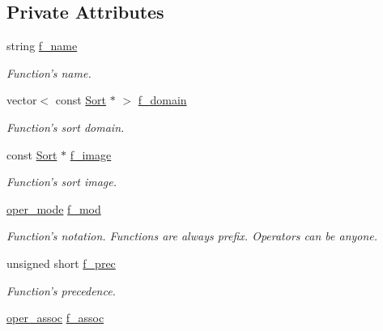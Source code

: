 \subsection*{Private Attributes}
\begin{DoxyCompactItemize}
\item 
string \hyperlink{classgenevalmag_1_1Function_adab115bdcdc014b30b2b9c9e2da07109}{f\_\-name}
\begin{DoxyCompactList}\small\item\em Function's name. \item\end{DoxyCompactList}\item 
vector$<$ const \hyperlink{classgenevalmag_1_1Sort}{Sort} $\ast$ $>$ \hyperlink{classgenevalmag_1_1Function_ae8e057eeebfabdc524e10e42e54da43c}{f\_\-domain}
\begin{DoxyCompactList}\small\item\em Function's sort domain. \item\end{DoxyCompactList}\item 
const \hyperlink{classgenevalmag_1_1Sort}{Sort} $\ast$ \hyperlink{classgenevalmag_1_1Function_a4abfbb9239231cf2a586935546a585f8}{f\_\-image}
\begin{DoxyCompactList}\small\item\em Function's sort image. \item\end{DoxyCompactList}\item 
\hyperlink{namespacegenevalmag_a8e412eca3897f0532c6f1997af777ba4}{oper\_\-mode} \hyperlink{classgenevalmag_1_1Function_a63645db8078f5c96b2c24d4873ee0fcd}{f\_\-mod}
\begin{DoxyCompactList}\small\item\em Function's notation. Functions are always prefix. Operators can be anyone. \item\end{DoxyCompactList}\item 
unsigned short \hyperlink{classgenevalmag_1_1Function_a24cd8c438fe7af6c23d91a83587acce9}{f\_\-prec}
\begin{DoxyCompactList}\small\item\em Function's precedence. \item\end{DoxyCompactList}\item 
\hyperlink{namespacegenevalmag_aed96782841eb4586b9e32ce72721d64b}{oper\_\-assoc} \hyperlink{classgenevalmag_1_1Function_a20f4e51ba6a747b7422406b6af6b40a1}{f\_\-assoc}

\end{DoxyCompactItemize}
